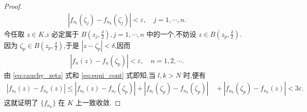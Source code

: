 \documentclass[../../main.tex]{subfiles}%
\begin{document}
\begin{proof}
\begin{align}
|f_{n_l}(\zeta_j) - f_{n_k}(\zeta_j)| < \varepsilon, \quad j=1, \cdots, n. \label{eq:cauchy_zeta}
\end{align}
今任取 \(z \in K\),\(z\) 必定属于 \(B\left(z_j, \frac{\delta}{2}\right), j=1, \cdots, n\) 中的一个,不妨设 \(z \in B\left(z_p, \frac{\delta}{2}\right)\). 因为 \(\zeta_p \in B\left(z_p, \frac{\delta}{2}\right)\),于是 \(|z - \zeta_p| < \delta\),因而
\begin{align}
|f_n(z) - f_n(\zeta_p)| < \varepsilon, \quad n=1, 2, \cdots. \label{eq:equi_cont}
\end{align}
由 \eqref{eq:cauchy_zeta} 式和 \eqref{eq:equi_cont} 式即知,当 \(l, k > N\) 时,便有
\begin{align*}
|f_{n_l}(z) - f_{n_k}(z)| \leqslant |f_{n_l}(z) - f_{n_l}(\zeta_p)| + |f_{n_l}(\zeta_p) - f_{n_k}(\zeta_p)| \quad + |f_{n_k}(\zeta_p) - f_{n_k}(z)| < 3\varepsilon.
\end{align*}
这就证明了 \(\{f_{n_k}\}\) 在 \(K\) 上一致收敛.
\end{proof}
\end{document}
